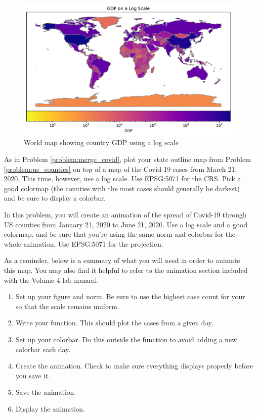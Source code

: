 \begin{figure}[H]
\begin{center}
\includegraphics[scale=.65]{figures/world_log.pdf}
\end{center}
\caption{World map showing country GDP using a log scale}
\label{figure:log_world}
\end{figure}

\begin{problem}
As in Problem \ref{problem:merge_covid}, plot your state outline map from Problem \ref{problem:us_counties} on top of a map of the Covid-19 cases from March 21, 2020.
This time, however, use a log scale.
Use EPSG:5071 for the CRS.
Pick a good colormap (the counties with the most cases should generally be darkest) and be sure to display a colorbar.
\end{problem}

\begin{problem}
In this problem, you will create an animation of the spread of Covid-19 through US counties from January 21, 2020 to June 21, 2020.
Use a log scale and a good colormap, and be sure that you're using the same norm and colorbar for the whole animation.
Use EPSG:5071 for the projection.

As a reminder, below is a summary of what you will need in order to animate this map.
You may also find it helpful to refer to the animation section included with the Volume 4 lab manual.

\begin{enumerate}
	\item Set up your figure and norm. Be sure to use the highest case count for your  so that the scale remains uniform.
	\item Write your  function. This should plot the cases from a given day.
	\item Set up your colorbar. Do this outside the  function to avoid adding a new colorbar each day.
	\item Create the animation. Check to make sure everything displays properly before you save it.
	\item Save the animation.
	\item Display the animation.
\end{enumerate}
\end{problem}
